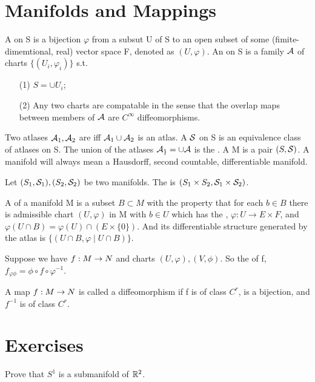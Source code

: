 \section{Manifolds and Mappings}
\begin{definition}
A  on S is a bijection $\varphi$ from a subsut U of S to an open subset of some (fimite-dimemtional, real)
vector space F, denoted as $(U,\varphi)$. An  on S is a family $\mathcal{A}$ of charts $\{(U_i,\varphi_i)\}$ s.t.
\begin{enumerate}
\item[(1)] $S=\cup U_i$;
\item[(2)] Any two charts are compatable in the sense that the overlap maps between members of $\mathcal{A}$ are $C^\infty$ 
diffeomorphisms. 
\end{enumerate}
\end{definition}
Two atlases $\mathcal{A}_1,\mathcal{A}_2$ are  iff $\mathcal{A}_1\cup \mathcal{A}_2$ is an atlas. A 
$\mathcal{S}$ on S is an equivalence class of atlases on S. The union of the atlases $\mathcal{A_g}=\cup \mathcal{A}$ is the .
A  M is a pair $(S,\mathcal{S})$. A manifold will always mean a Hausdorff, second countable, differentiable
manifold.
\begin{definition}
Let $(S_1,\mathcal{S}_1), (S_2,\mathcal{S}_2)$ be two manifolds. The  is $(S_1\times S_2, \mathcal{S}_1\times \mathcal{S}_2)$.
\end{definition}
\begin{definition}
A  of a manifold M is a subset $B\subset M$ with the property that for each $b\in B$ there is admissible chart 
$(U,\varphi)$ in M with $b\in U$ which has the , $\varphi:U\rightarrow E\times F$, and $\varphi(U\cap B)
=\varphi(U)\cap (E\times\{0\})$. And its differentiable structure generated by the atlas is $\lbrace(U\cap B, \varphi\mid U\cap 
B)\rbrace$.
\end{definition}
\begin{definition}
Suppose we have ${f}:{M}\rightarrow{N}$ and charts $(U,\varphi), (V,\phi)$. So the  of f, $f_{\varphi\phi}=
\phi\circ f\circ\varphi^{-1}$.
\end{definition}
\begin{definition}
A map ${f}:{M}\rightarrow{N}$ is called a diffeomorphism if f is of class $C^r$, is a bijection, and $f^{-1}$ is of class $C^r$.
\end{definition}
\section*{Exercises}
\begin{exer}
Prove that $S^1$ is a submanifold of $\mathbb{R}^{2}$.
\end{exer}
